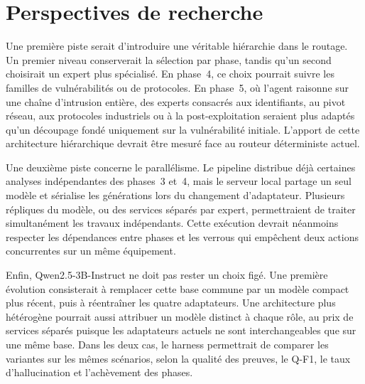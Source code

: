 \section{Perspectives de recherche}

Une première piste serait d'introduire une véritable hiérarchie dans le routage.
Un premier niveau conserverait la sélection par phase, tandis qu'un second
choisirait un expert plus spécialisé. En phase~4, ce choix pourrait suivre les
familles de vulnérabilités ou de protocoles. En phase~5, où l'agent raisonne sur
une chaîne d'intrusion entière, des experts consacrés aux identifiants, au pivot
réseau, aux protocoles industriels ou à la post-exploitation seraient plus
adaptés qu'un découpage fondé uniquement sur la vulnérabilité initiale. L'apport
de cette architecture hiérarchique devrait être mesuré face au routeur
déterministe actuel.

Une deuxième piste concerne le parallélisme. Le pipeline distribue déjà certaines
analyses indépendantes des phases~3 et~4, mais le serveur local partage un seul
modèle et sérialise les générations lors du changement d'adaptateur. Plusieurs
répliques du modèle, ou des services séparés par expert, permettraient de traiter
simultanément les travaux indépendants. Cette exécution devrait néanmoins
respecter les dépendances entre phases et les verrous qui empêchent deux actions
concurrentes sur un même équipement.

Enfin, Qwen2.5-3B-Instruct ne doit pas rester un choix figé. Une première
évolution consisterait à remplacer cette base commune par un modèle compact plus
récent, puis à réentraîner les quatre adaptateurs. Une architecture plus
hétérogène pourrait aussi attribuer un modèle distinct à chaque rôle, au prix de
services séparés puisque les adaptateurs actuels ne sont interchangeables que sur
une même base. Dans les deux cas, le harness permettrait de comparer les variantes
sur les mêmes scénarios, selon la qualité des preuves, le Q-F1, le taux
d'hallucination et l'achèvement des phases.
